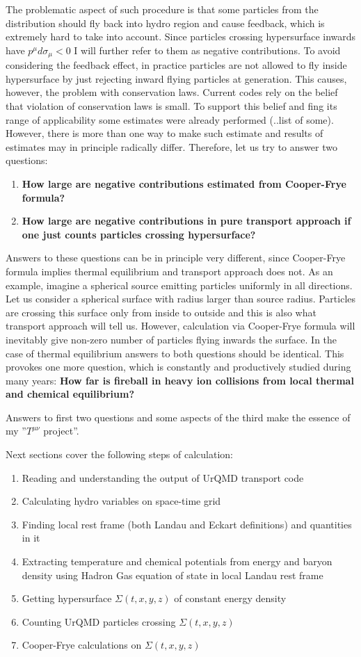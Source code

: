 \documentclass[12pt,a4paper]{report}
\begin{document}
The problematic aspect of such procedure is that some particles from the distribution should fly back into hydro region and cause feedback, which is extremely hard to take into account. Since particles crossing hypersurface inwards have $p^{\mu} d\sigma_{\mu} < 0 $ I will further refer to them as negative contributions. To avoid considering the feedback effect, in practice particles are not allowed to fly inside hypersurface by just rejecting inward flying particles at generation. This causes, however, the problem with conservation laws. Current codes rely on the belief that violation of conservation laws is small. To support this belief and fing its range of applicability some estimates were already performed (..list of some). However, there is more than one way to make such estimate and results of estimates may in principle radically differ. Therefore, let us try to answer two questions:
\begin{enumerate}
\item {\bf How large are negative contributions estimated from Cooper-Frye formula?}
\item {\bf How large are negative contributions in pure transport approach if one just counts particles crossing hypersurface?}
\end{enumerate}
Answers to these questions can be in principle very different, since Cooper-Frye formula implies thermal equilibrium and transport approach does not. As an example, imagine a spherical source emitting particles uniformly in all directions. Let us consider a spherical surface with radius larger than source radius. Particles are crossing this surface only from inside to outside and this is also what transport approach will tell us. However, calculation via Cooper-Frye formula will inevitably give non-zero number of particles flying inwards the surface. In the case of thermal equilibrium answers to both questions should be identical. This provokes one more question, which is constantly and productively studied during many years: {\bf How far is fireball in heavy ion collisions from local thermal and chemical equilibrium? }

Answers to first two questions and some aspects of the third make the essence of my ''$T^{\mu \nu}$ project''. 

Next sections cover the following steps of calculation:
\begin{enumerate}
\item Reading and understanding the output of UrQMD transport code
\item Calculating hydro variables on space-time grid
\item Finding local rest frame (both Landau and Eckart definitions) and quantities in it
\item Extracting temperature and chemical potentials from energy and baryon density using Hadron Gas equation of state in local Landau rest frame
\item Getting hypersurface $\Sigma(t,x,y,z)$ of constant energy density
\item Counting UrQMD particles crossing $\Sigma(t,x,y,z)$
\item Cooper-Frye calculations on $\Sigma(t,x,y,z)$
\end{enumerate}
\end{document}
